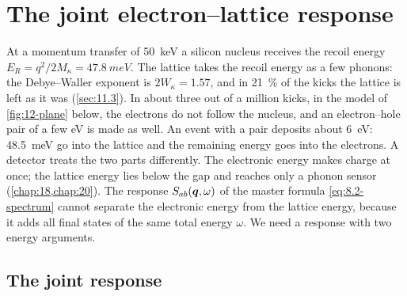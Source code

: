 \section{The joint electron--lattice response}\label{sec:12.1}

At a momentum transfer of \SI{50}{keV} a silicon nucleus receives the recoil energy $E_R = q^2/2M_\kappa = \SI{47.8}{meV}$. The lattice takes the recoil energy as a few phonons: the Debye--Waller exponent is $2W_\kappa = 1.57$, and in \SI{21}{\percent} of the kicks the lattice is left as it was (\cref{sec:11.3}). In about three out of a million kicks, in the model of \cref{fig:12-plane} below, the electrons do not follow the nucleus, and an electron--hole pair of a few eV is made as well. An event with a pair deposits about \SI{6}{eV}: \SI{48.5}{meV} go into the lattice and the remaining energy goes into the electrons. A detector treats the two parts differently. The electronic energy makes charge at once; the lattice energy lies below the gap and reaches only a phonon sensor (\cref{chap:18,chap:20}). The response $S_{ab}(\bm{q},\omega)$ of the master formula \cref{eq:8.2-spectrum} cannot separate the electronic energy from the lattice energy, because it adds all final states of the same total energy $\omega$. We need a response with two energy arguments.

\subsection{The joint response}\label{sec:12.1-def}

